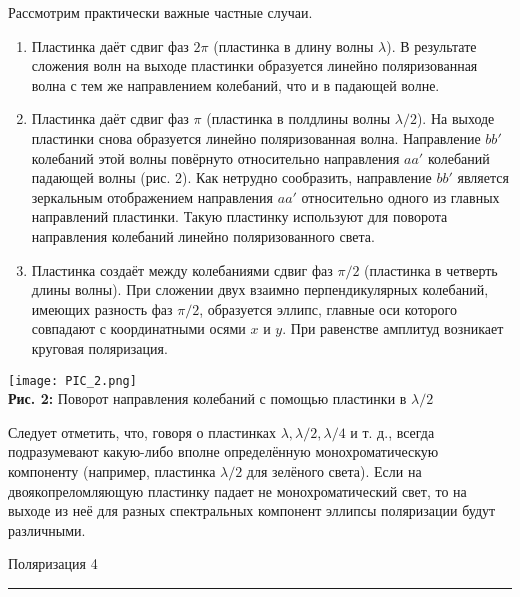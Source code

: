 \documentclass[12pt,a4paper]{scrartcl}
\begin{document}
	Рассмотрим практически важные частные случаи.
	
	\begin{enumerate}
		
		\item Пластинка даёт сдвиг фаз $ 2\pi $ (пластинка в длину волны $ \lambda $). В результате сложения волн на выходе пластинки образуется линейно поляризованная волна с тем же направлением колебаний, что и в падающей волне.
		
		\item Пластинка даёт сдвиг фаз $ \pi $ (пластинка в полдлины волны $ \lambda / 2 $). На выходе пластинки снова образуется линейно поляризованная волна. Направление $ bb' $ колебаний этой волны повёрнуто относительно направления $ aa' $ колебаний падающей волны (рис. 2). Как нетрудно сообразить, направление $ bb' $ является зеркальным отображением направления $ aa' $ относительно одного из главных направлений пластинки. Такую пластинку используют для поворота направления колебаний линейно поляризованного света.
		
		\item Пластинка создаёт между колебаниями сдвиг фаз $ \pi/2 $ (пластинка
		в четверть длины волны). При сложении двух взаимно перпендикулярных колебаний, имеющих разность фаз $ \pi/2 $, образуется эллипс, главные оси которого совпадают с координатными осями $ x $ и $ y $. При равенстве амплитуд возникает круговая поляризация.
		
	\end{enumerate}
	
	\begin{center}
		\texttt{[image: PIC\_2.png]}
		\\\textbf{Рис. 2:} Поворот направления колебаний с помощью пластинки в $ \lambda / 2 $
	\end{center}
	
	Следует отметить, что, говоря о пластинках $ \lambda , \lambda/2, \lambda/4  $ и т. д., всегда подразумевают какую-либо вполне определённую монохроматическую
	компоненту (например, пластинка $ \lambda/2 $ для зелёного света). Если на двоякопреломляющую пластинку падает не монохроматический свет, то на
	выходе из неё для разных спектральных компонент эллипсы поляризации будут различными.
	
	\newpage
	
	
	\begin{flushleft}
		\footnotesize{Поляризация} \hspace{\fill} \footnotesize{4}
		\\[-0.3cm]\noindent\rule{\textwidth}{0.3pt}
	\end{flushleft}
	
\end{document}
